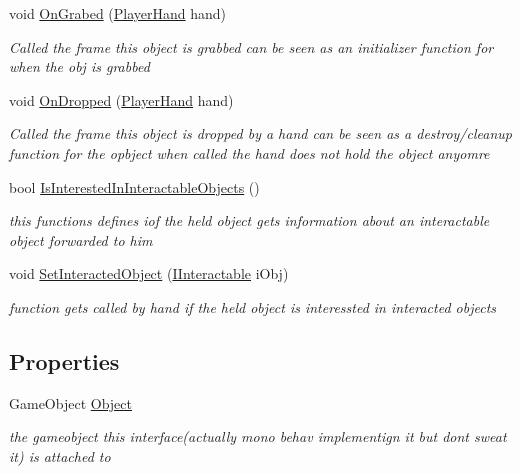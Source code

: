 \begin{DoxyCompactItemize}
void \mbox{\hyperlink{interface_i_holdable_object_a7b8a42a0c12a26b1668c4dd904f38355}{On\+Grabed}} (\mbox{\hyperlink{class_player_hand}{Player\+Hand}} hand)
\begin{DoxyCompactList}\small\item\em Called the frame this object is grabbed can be seen as an initializer function for when the obj is grabbed \end{DoxyCompactList}\item 
void \mbox{\hyperlink{interface_i_holdable_object_a19523673c41505d8533aa50b957e95a1}{On\+Dropped}} (\mbox{\hyperlink{class_player_hand}{Player\+Hand}} hand)
\begin{DoxyCompactList}\small\item\em Called the frame this object is dropped by a hand can be seen as a destroy/cleanup function for the opbject when called the hand does not hold the object anyomre \end{DoxyCompactList}\item 
bool \mbox{\hyperlink{interface_i_holdable_object_a0356d534c17ab4e04fba00b42abeea77}{Is\+Interested\+In\+Interactable\+Objects}} ()
\begin{DoxyCompactList}\small\item\em this functions defines iof the held object gets information about an interactable object forwarded to him \end{DoxyCompactList}\item 
void \mbox{\hyperlink{interface_i_holdable_object_aeb32a55273b99d16f9fb5b86f6a73f80}{Set\+Interacted\+Object}} (\mbox{\hyperlink{interface_i_interactable}{I\+Interactable}} i\+Obj)
\begin{DoxyCompactList}\small\item\em function get\textquotesingle{}s called by hand if the held object is interessted in interacted objects \end{DoxyCompactList}\end{DoxyCompactItemize}
\subsection*{Properties}
\begin{DoxyCompactItemize}
\item 
Game\+Object \mbox{\hyperlink{interface_i_holdable_object_a99b6760e4f5c71c79d8b084673a3818b}{Object}}
\begin{DoxyCompactList}\small\item\em the gameobject this interface(actually mono behav implementign it but don\textquotesingle{}t sweat it) is attached to \end{DoxyCompactList}\end{DoxyCompactItemize}


